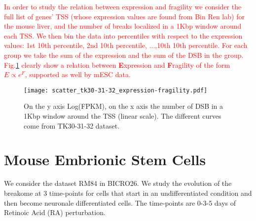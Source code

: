 \documentclass[11pt,a4paper]{article}
\newcommand{\red}[1]{\textcolor{red}{#1}}
\begin{document}
\red{In order to study the relation between expression and fragility we consider the full list 
of genes' TSS (whose expression values are found from Bin Ren lab) for the mouse liver, and the number of breaks localized in a 1Kbp window around each TSS. We then bin the data into percentiles with respect to the expression values: 1st 10th percentile, 2nd 10th percentile, ...,10th 10th percentile. For each group we take the sum of the expression and the sum of the DSB in the group.  
Fig.\ref{fig:scatter_tk30-31-32_expression-fragility} clearly show a relation between {\bf E}xpression and {\bf F}ragility of the form $E \propto e^F$, supported as well by mESC data.}

\begin{figure}[hbtp]
 \centering
 \texttt{[image: scatter\_tk30-31-32\_expression-fragility.pdf]}
 \caption{On the y axis Log(FPKM), on the x axis the number of DSB in a 1Kbp window around the TSS (linear scale). The different curves come from TK30-31-32 dataset.}
 \label{fig:scatter_tk30-31-32_expression-fragility}
 \end{figure}
  







\section{Mouse Embrionic Stem Cells}
We consider the dataset RM84 in BICRO26. We study the evolution of the breakome at 3 time-points for cells that start in an undifferentiated condition and then become neuronale differentiated cells. The time-points are 0-3-5 days of Retinoic Acid (RA) perturbation. 
\end{document}
